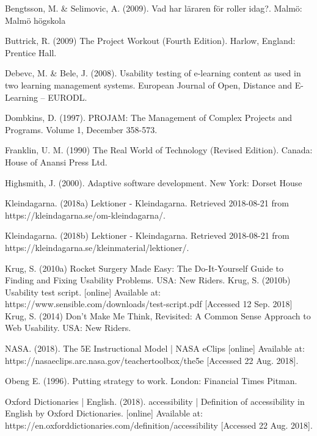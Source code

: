 \makeatletter
\renewcommand\@biblabel[1]{}
\makeatother

\begin{thebibliography}{69}

     Bengtsson, M. \& Selimovic, A. (2009). Vad har läraren för roller idag?. Malmö: Malmö högskola

     Buttrick, R. (2009) The Project Workout (Fourth Edition). Harlow, England: Prentice Hall.
 
	 Debevc, M. \& Bele, J. (2008). Usability testing of e-learning content as used in two learning management systems. European Journal of Open, Distance and E-Learning – EURODL. 
 
     Dombkins, D. (1997). PROJAM: The Management of Complex Projects and Programs. Volume 1, December 358-573.
  
     Franklin, U. M. (1990) The Real World of Technology (Revised Edition). Canada: House of Anansi Press Ltd.
  
     Highsmith, J. (2000). Adaptive software development. New York: Dorset House
  
     Kleindagarna. (2018a) Lektioner - Kleindagarna. Retrieved 2018-08-21 from https://kleindagarna.se/om-kleindagarna/.
  
     Kleindagarna. (2018b) Lektioner - Kleindagarna. Retrieved 2018-08-21 from https://kleindagarna.se/kleinmaterial/lektioner/.
  
     Krug, S. (2010a) Rocket Surgery Made Easy: The Do-It-Yourself Guide to Finding and Fixing Usability Problems. USA: New Riders.
	 Krug, S. (2010b) Usability test script. [online] Available at: https://www.sensible.com/downloads/test-script.pdf [Accessed 12 Sep. 2018]
     Krug, S. (2014) Don't Make Me Think, Revisited: A Common Sense Approach to Web Usability. USA: New Riders.
    
     NASA. (2018). The 5E Instructional Model | NASA eClips [online] Available at: https://nasaeclips.arc.nasa.gov/teachertoolbox/the5e [Accessed 22 Aug. 2018].

     Obeng E. (1996). Putting strategy to work. London: Financial Times Pitman.

     Oxford Dictionaries | English. (2018). accessibility | Definition of accessibility in English by Oxford Dictionaries. [online] Available at: https://en.oxforddictionaries.com/definition/accessibility [Accessed 22 Aug. 2018].


\end{thebibliography}
